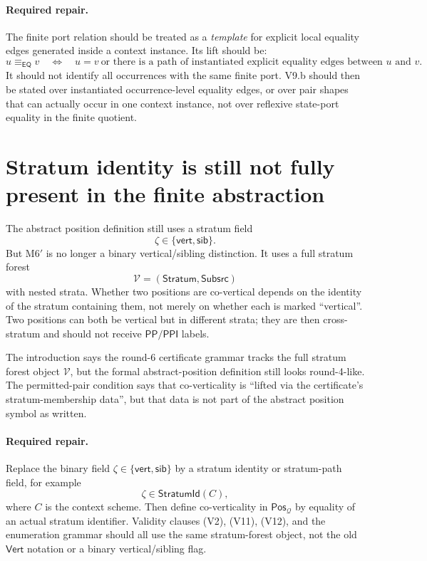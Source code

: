\documentclass[11pt]{article}
\newcommand{\EQ}{\mathsf{EQ}}
\newcommand{\PP}{\mathsf{PP}}
\newcommand{\PPI}{\mathsf{PPI}}
\newcommand{\Q}{\mathcal Q}
\newcommand{\Pos}{\mathsf{Pos}}
\newcommand{\eqc}{\equiv_{\EQ}}
\newcommand{\Stratum}{\mathsf{Stratum}}
\newcommand{\Subsrc}{\mathsf{Subsrc}}
\newcommand{\Vrt}{\mathsf{Vert}}
\newcommand{\vertical}{\mathsf{vert}}
\newcommand{\sibling}{\mathsf{sib}}
\begin{document}
\paragraph{Required repair.}
The finite port relation should be treated as a \emph{template} for explicit
local equality edges generated inside a context instance.  Its lift should be:
\[
  u\eqc v
  \quad\Longleftrightarrow\quad
  u=v\ \text{or there is a path of instantiated explicit equality edges between }u\text{ and }v.
\]
It should not identify all occurrences with the same finite port.  V9.b should
then be stated over instantiated occurrence-level equality edges, or over pair
shapes that can actually occur in one context instance, not over reflexive
state-port equality in the finite quotient.

\section{Stratum identity is still not fully present in the finite abstraction}

The abstract position definition still uses a stratum field
\[
  \zeta\in\{\vertical,\sibling\}.
\]
But M6$'$ is no longer a binary vertical/sibling distinction.  It uses a full
stratum forest
\[
  \mathcal V=(\Stratum,\Subsrc)
\]
with nested strata.  Whether two positions are co-vertical depends on the
identity of the stratum containing them, not merely on whether each is marked
``vertical''.  Two positions can both be vertical but in different strata; they
are then cross-stratum and should not receive $\PP/\PPI$ labels.

The introduction says the round-6 certificate grammar tracks the full stratum
forest object $\mathcal V$, but the formal abstract-position definition still
looks round-4-like.  The permitted-pair condition says that co-verticality is
``lifted via the certificate's stratum-membership data'', but that data is not
part of the abstract position symbol as written.

\paragraph{Required repair.}
Replace the binary field $\zeta\in\{\vertical,\sibling\}$ by a stratum identity
or stratum-path field, for example
\[
  \zeta \in \mathsf{StratumId}(C),
\]
where $C$ is the context scheme.  Then define co-verticality in
$\Pos_{\Q}$ by equality of an actual stratum identifier.  Validity clauses
(V2), (V11), (V12), and the enumeration grammar should all use the same
stratum-forest object, not the old $\Vrt$ notation or a binary vertical/sibling
flag.
\end{document}

